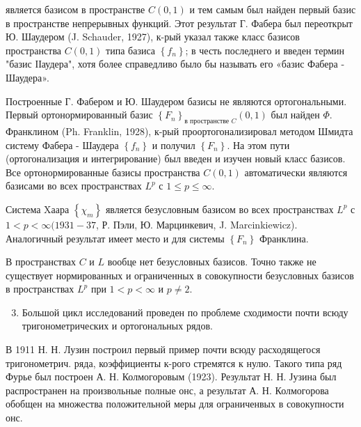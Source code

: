 \documentclass[10pt]{article}
\begin{document}
является базисом в пространстве $C(0,1)$ и тем самым был найден первый базис в пространстве непрерывных функций. Этот результат Г. Фабера был переоткрыт Ю. Шаудером (J. Schauder, 1927), к-рый указал также класс базисов пространства $C(0,1)$ типа базиса $\left\{f_{n}\right\}$; в честь последнего и введен термин "базис ІІаудера", хотя более справедливо было бы называть его «базис Фабера - Шаудера».



Построенные Г. Фабером и Ю. Шаудером базисы не являются ортогональными. Первый ортонормированный базис $\left\{F_{n}\right\}_{\text {в пространстве } C}(0,1)$ был найден $\Phi$. Франклином (Ph. Franklin, 1928), к-рый проортогонализировал методом Шмидта систему Фабера - Шаудера $\left\{f_{n}\right\}$ и получил $\left\{F_{n}\right\}$. На этом пути (ортогонализация и интегрирование) был введен и изучен новый класс базисов. Все ортонормированные базисы пространства $C(0,1)$ автоматически являются базисами во всех пространствах $L^{p}$ с $1 \leqslant p \leqslant \infty$.



Система Xаара $\left\{\chi_{m}\right\}$ является безусловным базисом во всех пространствах $L^{p}$ с $1<p<\infty(1931-37$, Р. Пэли, Ю. Марцинкевич, J. Marcinkiewicz). Аналогичный результат имеет место и для системы $\left\{F_{n}\right\}$ Франклина.



В пространствах $C$ и $L$ вообце нет безусловных базисов. Точно также не существует нормированных и ограниченных в совокупности безусловных базисов в пространствах $L^{p}$ при $1<p<\infty$ и $p \neq 2$.



\begin{enumerate}

  \setcounter{enumi}{2}

  \item Большой цикл исследований проведен по проблеме сходимости почти всюду тригонометрических и ортогональных рядов.

\end{enumerate}



В 1911 Н. Н. Лузин построил первый пример почти всюду расходящегося тригонометрич. ряда, коэффициенты к-рого стремятся к нулю. Такого типа ряд Фурье был построен А. Н. Колмогоровым (1923). Результат Н. Н. Јузина был распространен на произвольные полные онс, а результат А. Н. Колмогорова обобщен на множества положительной меры для ограниченвых в совокупности онс.
\end{document}
